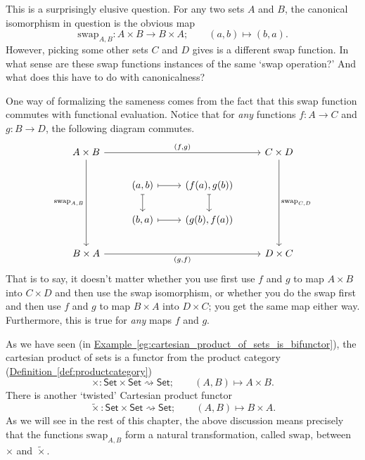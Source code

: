\documentclass[main.tex]{subfiles}
\begin{document}
This is a surprisingly elusive question. For any two sets $A$ and $B$, the canonical isomorphism in question is the obvious map
\begin{equation*}
  \mathrm{swap}_{A,B}\colon A \times B \to B \times A; \qquad (a, b) \mapsto (b, a).
\end{equation*}
However, picking some other sets $C$ and $D$ gives is a different swap function. In what sense are these swap functions instances of the same `swap operation?' And what does this have to do with canonicalness?

One way of formalizing the sameness comes from the fact that this swap function commutes with functional evaluation. Notice that for \emph{any} functions $f\colon A \to C$ and $g\colon B \to D$, the following diagram commutes.
\begin{equation*}
  \begin{tikzcd}
    A \times B
    \arrow[rrr, "{(f, g)}"]
    \arrow[ddd, swap, "{\mathrm{swap}_{A, B}}"]
    &&& C \times D
    \arrow[ddd, "{\mathrm{swap}_{C, D}}"]
    \\
    & (a, b)
    \arrow[r, mapsto]
    \arrow[d, mapsto]
    & (f(a), g(b))
    \arrow[d, mapsto]
    \\
    & (b, a)
    \arrow[r, mapsto]
    & (g(b), f(a))
    \\
    B \times A
    \arrow[rrr, swap, "{(g, f)}"]
    &&& D \times C
  \end{tikzcd}
\end{equation*}
That is to say, it doesn't matter whether you use first use $f$ and $g$ to map $A \times B$ into $C \times D$ and then use the swap isomorphism, or whether you do the swap first and then use $f$ and $g$ to map $B \times A$ into $D \times C$; you get the same map either way. Furthermore, this is true for \emph{any} maps $f$ and $g$.

As we have seen (in \hyperref[eg:cartesian_product_of_sets_is_bifunctor]{Example~\ref*{eg:cartesian_product_of_sets_is_bifunctor}}), the cartesian product of sets is a functor from the product category (\hyperref[def:productcategory]{Definition~\ref*{def:productcategory}})
\begin{equation*}
  \times\colon \mathsf{Set} \times \mathsf{Set} \rightsquigarrow \mathsf{Set};\qquad (A, B) \mapsto A \times B.
\end{equation*}
There is another `twisted' Cartesian product functor
\begin{equation*}
  \tilde{\times}\colon \mathsf{Set} \times \mathsf{Set} \rightsquigarrow \mathsf{Set};\qquad (A, B) \mapsto B \times A.
\end{equation*}
As we will see in the rest of this chapter, the above discussion means precisely that the functions $\mathrm{swap}_{A,B}$ form a natural transformation, called $\mathrm{swap}$, between $\times$ and $\tilde{\times}$.
\end{document}
